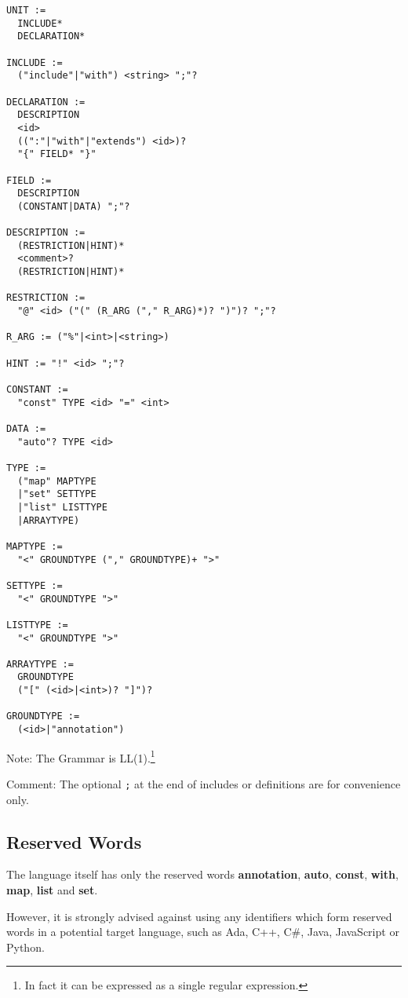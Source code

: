 \documentclass[a4paper,10pt]{article}
\begin{document}
\begin{verbatim}
UNIT :=
  INCLUDE*
  DECLARATION*

INCLUDE := 
  ("include"|"with") <string> ";"?

DECLARATION :=
  DESCRIPTION
  <id>
  ((":"|"with"|"extends") <id>)?
  "{" FIELD* "}"
  
FIELD :=
  DESCRIPTION
  (CONSTANT|DATA) ";"?
  
DESCRIPTION := 
  (RESTRICTION|HINT)*
  <comment>?
  (RESTRICTION|HINT)*
  
RESTRICTION :=
  "@" <id> ("(" (R_ARG ("," R_ARG)*)? ")")? ";"?
  
R_ARG := ("%"|<int>|<string>)

HINT := "!" <id> ";"?
  
CONSTANT :=
  "const" TYPE <id> "=" <int>
  
DATA :=
  "auto"? TYPE <id>
  
TYPE :=
  ("map" MAPTYPE
  |"set" SETTYPE
  |"list" LISTTYPE
  |ARRAYTYPE)
  
MAPTYPE :=
  "<" GROUNDTYPE ("," GROUNDTYPE)+ ">"
  
SETTYPE :=
  "<" GROUNDTYPE ">"
  
LISTTYPE :=
  "<" GROUNDTYPE ">"
  
ARRAYTYPE :=
  GROUNDTYPE
  ("[" (<id>|<int>)? "]")?
  
GROUNDTYPE :=
  (<id>|"annotation")

\end{verbatim}
Note: The Grammar is LL(1).\footnote{In fact it can be expressed as a single regular expression.}

Comment: The optional \texttt{;} at the end of includes or definitions are for convenience only.

\subsection{Reserved Words}

The language itself has only the reserved words \textbf{annotation}, \textbf{auto}, \textbf{const}, \textbf{with}, \textbf{map}, \textbf{list} and \textbf{set}. 

However, it is strongly advised against using any identifiers which form reserved words in a potential target language, such as Ada, C++, C\#, Java, JavaScript or Python.
\end{document}
